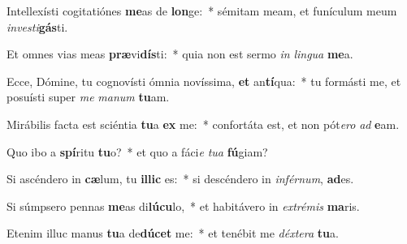 \item Intellexísti cogitatiónes \textbf{me}as de \textbf{lon}ge:~* sémitam meam, et funículum meum \textit{in}\textit{ves}\textit{ti}\textbf{gás}ti.
\item Et omnes vias meas \textbf{præ}vi\textbf{dís}ti:~* quia non est sermo \textit{in} \textit{lin}\textit{gua} \textbf{me}a.
\item Ecce, Dómine, tu cognovísti ómnia novíssima, \textbf{et} an\textbf{tí}qua:~* tu formásti me, et posuísti super \textit{me} \textit{ma}\textit{num} \textbf{tu}am.
\item Mirábilis facta est sciéntia \textbf{tu}a \textbf{ex} me:~* confortáta est, et non pót\textit{e}\textit{ro} \textit{ad} \textbf{e}am.
\item Quo ibo a \textbf{spí}ritu \textbf{tu}o?~* et quo a fáci\textit{e} \textit{tu}\textit{a} \textbf{fú}giam?
\item Si ascéndero in \textbf{cæ}lum, tu \textbf{il}\textbf{lic} es:~* si descéndero in \textit{in}\textit{fér}\textit{num}, \textbf{ad}es.
\item Si súmpsero pennas \textbf{me}as di\textbf{lú}\textbf{cu}lo,~* et habitávero in \textit{ex}\textit{tré}\textit{mis} \textbf{ma}ris.
\item Etenim illuc manus \textbf{tu}a de\textbf{dú}\textbf{cet} me:~* et tenébit me \textit{déx}\textit{te}\textit{ra} \textbf{tu}a.
